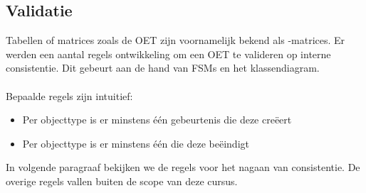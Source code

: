 \documentclass[../../main.tex]{subfiles}
\begin{document}
\subsection{Validatie}
Tabellen of matrices zoals de OET zijn voornamelijk bekend als -matrices. Er werden een aantal regels ontwikkeling om een OET te valideren op interne consistentie. Dit gebeurt aan de hand van FSMs en het klassendiagram. \\
\\
Bepaalde regels zijn intuitief:
\begin{itemize}
	\item Per objecttype is er minstens \'e\'en gebeurtenis die deze cre\"eert
	\item Per objecttype is er minstens \'e\'en die deze be\"eindigt
\end{itemize}
In volgende paragraaf bekijken we de regels voor het nagaan van consistentie. De overige regels vallen buiten de scope van deze cursus.
\end{document}
